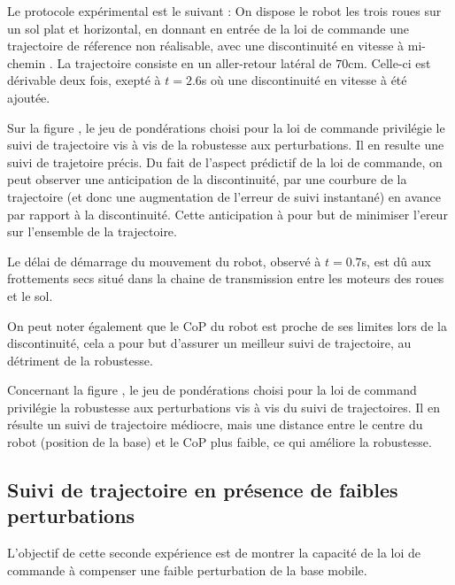 	      Le protocole expérimental est le suivant :
	      On dispose le robot les trois roues sur un sol plat et horizontal, en donnant en entrée de la loi de commande une trajectoire de réference non réalisable, avec une discontinuité en vitesse à mi-chemin .
	      La trajectoire consiste en un aller-retour latéral de $70$cm. Celle-ci est dérivable deux fois, exepté à $t=2.6$s où une discontinuité en vitesse à été ajoutée.
	      
	    
	    Sur la figure , le jeu de pondérations choisi pour la loi de commande privilégie le suivi de trajectoire vis à vis de la robustesse aux perturbations.
	    Il en resulte une suivi de trajetoire précis.
	    Du fait de l'aspect prédictif de la loi de commande, on peut observer une anticipation de la discontinuité, par une courbure de la trajectoire (et donc une augmentation de l'erreur de suivi instantané) en avance par rapport à la discontinuité.
	    Cette anticipation à pour but de minimiser l'ereur sur l'ensemble de la trajectoire.
	    
	    Le délai de démarrage du mouvement du robot, observé à $t=0.7$s, est dû aux frottements secs situé dans la chaine de transmission entre les moteurs des roues et le sol.
	    
	    On peut noter également que le CoP du robot est proche de ses limites lors de la discontinuité, cela a pour but d'assurer un meilleur suivi de trajectoire, au détriment de la robustesse.
	  
	    Concernant la figure , le jeu de pondérations choisi pour la loi de command privilégie la robustesse aux perturbations vis à vis du suivi de trajectoires.
	    Il en résulte un suivi de trajectoire médiocre, mais une distance entre le centre du robot (position de la base) et le CoP plus faible, ce qui améliore la robustesse.
	    
	\subsection{Suivi de trajectoire en présence de faibles perturbations}
	    
	      
	      L'objectif de cette seconde expérience  est de montrer la capacité de la loi de commande à compenser une faible perturbation de la base mobile.
	     
